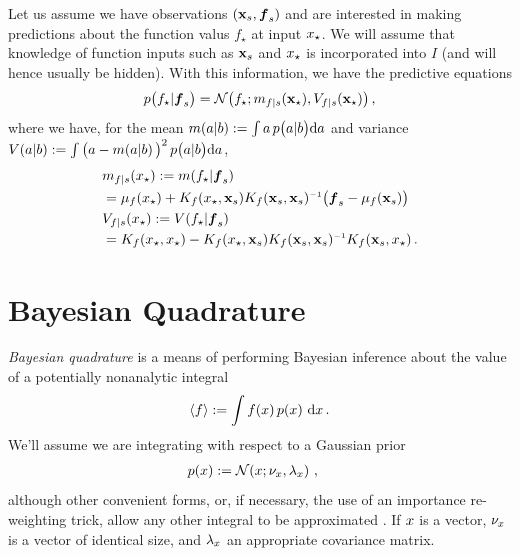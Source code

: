 \documentclass{article}
\renewcommand{\pskinny}[2]{p\big(#1|#2\big)}
\begin{document}
Let us assume we have observations $(\vlfv_s,\vf_s)$ and are interested in making predictions about the function valus $f_\star$ at input $\lfv_\star$. We will assume that knowledge of function inputs such as $\vlfv_s$ and $\lfv_\star$ is incorporated into $I$ (and will hence usually be hidden). With this information, we have the predictive equations
$$
\pskinny{f\st}{\vf_s} = 
\bN{f\st}
{\meancond{f}{\vlfv_\star}{s}}
{\covcond{f}{\vlfv_\star}{s}}\,,
$$
where we have, for the mean $\novmean{a}{b}\deq \int a\,\pskinny{a}{b} \ud
a$ and variance $\novcov{a}{b}\deq \int
\big(a-\novmean{a}{b}\big)^2\,\pskinny{a}{b} \ud a$,
\begin{align} 
\textstyle
&\meancond{f}{\lfv_\star}{s}
\deq \mean{f_\star}{\vf_s}
\nonumber\\
&= \mu_{f}(\lfv_\star) + 
K_{f}(\lfv_\star,\vlfv_s)
K_{f}(\vlfv_s,\vlfv_s)\inv
\bigl(\vf_s-{\mu}_{f}(\vlfv_s)\bigr) \label{eq:GPMean}
\\
&\covcond{f}{\lfv_\star}{s}
\deq {\cov{f_\star}{\vf_s}} 
\nonumber\\
&= K_{f}(\lfv_\star,\lfv_\star) - 
K_{f}(\lfv_\star,\vlfv_s)
K_{f}(\vlfv_s,\vlfv_s)\inv
K_{f}(\vlfv_s,\lfv_\star)\,. \nonumber%
\end{align} 

\section{Bayesian Quadrature} \label{sec:BQ}


\emph{Bayesian quadrature} \citep{BZHermiteQuadrature,BZMonteCarlo} is a means of performing Bayesian inference about the value of a potentially nonanalytic integral 
\begin{equation} \label{eq:intyf}
 \inty{f} \deq \int f(\lfv)\,\po{\lfv}\,\ud\lfv\,.
\end{equation}
We'll assume we are integrating with respect to a Gaussian prior
\begin{align}\label{eq:phiprior}
\textstyle
 \po{\lfv} & \deq \N{\lfv}{\nu_{\lfv}}{\lambda_{\lfv}} \,,
\end{align}
although other convenient forms, or, if necessary, the use of an importance re-weighting trick, allow any other integral to be approximated \citep{OsborneAnon}. If $\lfv$ is a vector, $\nu_{\lfv}$ is a  vector of identical size, and $\lambda_{\lfv}$ an appropriate covariance matrix.
\end{document}
